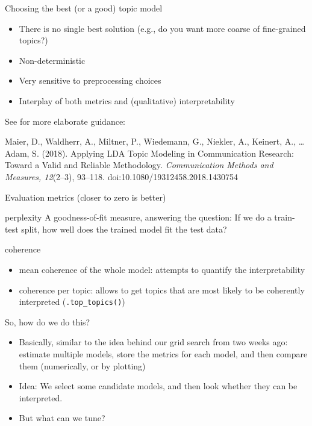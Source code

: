 \begin{frame}{Choosing the best (or a good) topic model}
\begin{itemize}
\item There is no single best solution (e.g., do you want more coarse of fine-grained topics?)
\item Non-deterministic
\item Very sensitive to preprocessing choices
\item Interplay of both metrics and (qualitative) interpretability 
\end{itemize}

See for more elaborate guidance:

\tiny{Maier, D., Waldherr, A., Miltner, P., Wiedemann, G., Niekler, A., Keinert, A., \ldots Adam, S. (2018). Applying LDA Topic Modeling in Communication Research: Toward a Valid and Reliable Methodology. \textit{Communication Methods and Measures, 12}(2--3), 93--118. doi:10.1080/19312458.2018.1430754}

\end{frame}



\begin{frame}{Evaluation metrics (closer to zero is better)}
\begin{block}{perplexity}
A goodness-of-fit measure, answering the question: If we do a train-test split, how well does the trained model fit the test data?
\end{block}

\pause 
\begin{block}{coherence}
\begin{itemize}
\item mean coherence of the whole model: attempts to quantify the interpretability
\item coherence per topic: allows to get topics that are most likely to be coherently interpreted (\texttt{.top\_topics()})
\end{itemize}
\end{block}

\end{frame}


\begin{frame}{So, how do we do this?}
\begin{itemize}[<+->]
	\item Basically, similar to the idea behind our grid search from two weeks ago: estimate multiple models, store the metrics for each model, and then compare them (numerically, or by plotting)
	\item Idea: We select some candidate models, and then look whether they can be interpreted.
	\item But what can we tune?
\end{itemize}
\end{frame}


